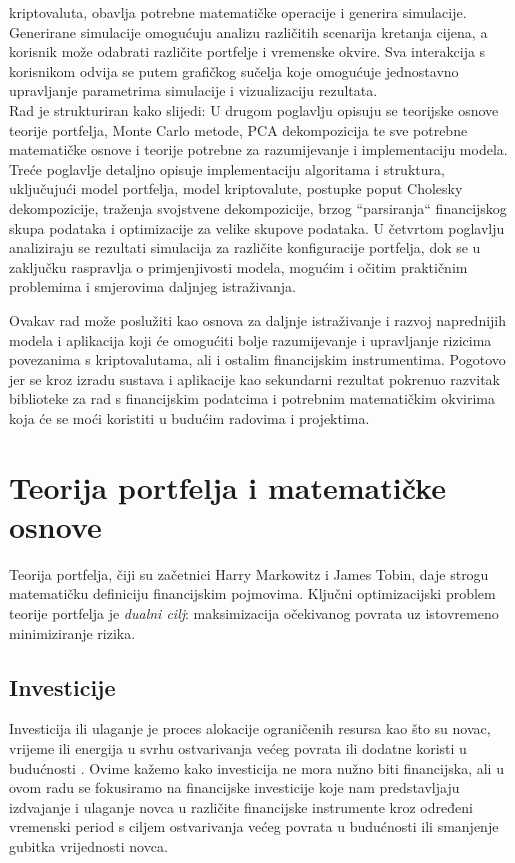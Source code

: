 \documentclass[zavrsnirad]{fer}
\begin{document}
kriptovaluta, obavlja potrebne matematičke operacije i generira simulacije.
Generirane simulacije omogućuju analizu različitih scenarija kretanja cijena,
a korisnik može odabrati različite portfelje i vremenske okvire.
Sva interakcija s korisnikom odvija se putem grafičkog sučelja koje
omogućuje jednostavno upravljanje parametrima simulacije i vizualizaciju
rezultata.\\
Rad je strukturiran kako slijedi: U drugom poglavlju opisuju se teorijske
osnove teorije portfelja, Monte Carlo metode, PCA dekompozicija te
sve potrebne matematičke osnove i teorije potrebne za razumijevanje
i implementaciju modela.
Treće poglavlje detaljno opisuje implementaciju algoritama i struktura, uključujući
model portfelja, model kriptovalute, postupke poput Cholesky dekompozicije,
traženja svojstvene dekompozicije, brzog ``parsiranja`` financijskog skupa podataka
i optimizacije za velike skupove podataka.
U četvrtom poglavlju analiziraju se rezultati simulacija za različite
konfiguracije portfelja, dok se u zaključku raspravlja o primjenjivosti
modela, mogućim i očitim praktičnim problemima i smjerovima daljnjeg istraživanja.

Ovakav rad može poslužiti kao osnova za daljnje istraživanje i razvoj
naprednijih modela i aplikacija koji će omogućiti bolje razumijevanje i upravljanje
rizicima povezanima s kriptovalutama, ali i ostalim financijskim instrumentima.
Pogotovo jer se kroz izradu sustava i aplikacije kao sekundarni rezultat
pokrenuo razvitak biblioteke za rad s financijskim podatcima i potrebnim
matematičkim okvirima koja će se moći koristiti u budućim radovima i projektima.

\chapter{Teorija portfelja i matematičke osnove}
\label{pog:teorija_portelja}
Teorija portfelja, čiji su začetnici Harry Markowitz i James Tobin,
daje strogu matematičku definiciju financijskim pojmovima.
Ključni optimizacijski problem teorije portfelja je
\textit{dualni cilj}: maksimizacija očekivanog povrata
uz istovremeno minimiziranje rizika.

\section{Investicije}
\label{sek:investicije}
Investicija ili ulaganje je proces alokacije ograničenih resursa
kao što su novac, vrijeme ili energija u svrhu ostvarivanja
većeg povrata ili dodatne koristi u budućnosti \cite{Investments}.
Ovime kažemo kako investicija ne mora nužno biti financijska,
ali u ovom radu se fokusiramo na financijske investicije koje nam
predstavljaju izdvajanje i ulaganje novca u različite financijske instrumente
kroz određeni vremenski period s ciljem ostvarivanja većeg povrata
u budućnosti ili smanjenje gubitka vrijednosti novca.
\end{document}
